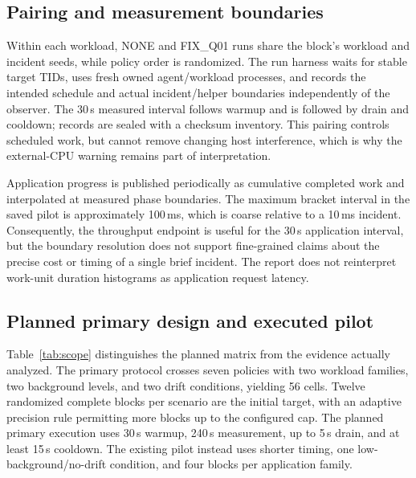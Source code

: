 \documentclass[conference]{IEEEtran}
\begin{document}
\subsection{Pairing and measurement boundaries}
Within each workload, NONE and FIX\_Q01 runs share the block's workload and incident seeds, while policy order is randomized. The run harness waits for stable target TIDs, uses fresh owned agent/workload processes, and records the intended schedule and actual incident/helper boundaries independently of the observer. The 30\,s measured interval follows warmup and is followed by drain and cooldown; records are sealed with a checksum inventory. This pairing controls scheduled work, but cannot remove changing host interference, which is why the external-CPU warning remains part of interpretation.

Application progress is published periodically as cumulative completed work and interpolated at measured phase boundaries. The maximum bracket interval in the saved pilot is approximately 100\,ms, which is coarse relative to a 10\,ms incident. Consequently, the throughput endpoint is useful for the 30\,s application interval, but the boundary resolution does not support fine-grained claims about the precise cost or timing of a single brief incident. The report does not reinterpret work-unit duration histograms as application request latency.

\subsection{Planned primary design and executed pilot}
Table~\ref{tab:scope} distinguishes the planned matrix from the evidence actually analyzed. The primary protocol crosses seven policies with two workload families, two background levels, and two drift conditions, yielding 56 cells. Twelve randomized complete blocks per scenario are the initial target, with an adaptive precision rule permitting more blocks up to the configured cap. The planned primary execution uses 30\,s warmup, 240\,s measurement, up to 5\,s drain, and at least 15\,s cooldown. The existing pilot instead uses shorter timing, one low-background/no-drift condition, and four blocks per application family.
\end{document}
